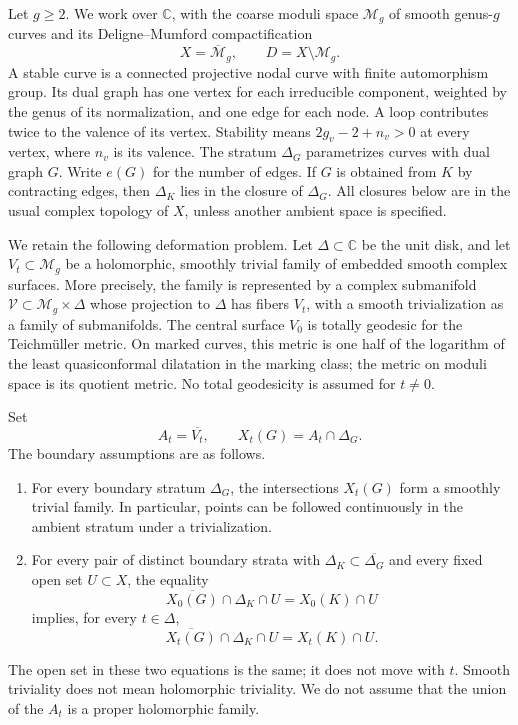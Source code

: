 \documentclass[11pt]{article}
\newcommand{\M}{\mathcal M}
\newcommand{\Mb}{\overline{\mathcal M}}
\newcommand{\C}{\mathbb C}
\newcommand{\cl}[1]{\overline{#1}}
\theoremstyle{definition}
\theoremstyle{remark}
\begin{document}
Let $g\geq2$. We work over $\C$, with the coarse moduli space $\M_g$ of smooth genus-$g$ curves and its Deligne--Mumford compactification
\[
 X=\Mb_g,\qquad D=X\setminus\M_g.
\]
A stable curve is a connected projective nodal curve with finite automorphism group. Its dual graph has one vertex for each irreducible component, weighted by the genus of its normalization, and one edge for each node. A loop contributes twice to the valence of its vertex. Stability means $2g_v-2+n_v>0$ at every vertex, where $n_v$ is its valence. The stratum $\Delta_G$ parametrizes curves with dual graph $G$. Write $e(G)$ for the number of edges. If $G$ is obtained from $K$ by contracting edges, then $\Delta_K$ lies in the closure of $\Delta_G$. All closures below are in the usual complex topology of $X$, unless another ambient space is specified.

We retain the following deformation problem. Let $\Delta\subset\C$ be the unit disk, and let $V_t\subset\M_g$ be a holomorphic, smoothly trivial family of embedded smooth complex surfaces. More precisely, the family is represented by a complex submanifold $\mathcal V\subset\M_g\times\Delta$ whose projection to $\Delta$ has fibers $V_t$, with a smooth trivialization as a family of submanifolds. The central surface $V_0$ is totally geodesic for the Teichm\"uller metric. On marked curves, this metric is one half of the logarithm of the least quasiconformal dilatation in the marking class; the metric on moduli space is its quotient metric. No total geodesicity is assumed for $t\ne0$.

Set
\[
 A_t=\cl{V_t},\qquad X_t(G)=A_t\cap\Delta_G.
\]
The boundary assumptions are as follows.
\begin{enumerate}[label=(\roman*),leftmargin=*]
\item\label{hyp:trivial} For every boundary stratum $\Delta_G$, the intersections $X_t(G)$ form a smoothly trivial family. In particular, points can be followed continuously in the ambient stratum under a trivialization.
\item\label{hyp:compat} For every pair of distinct boundary strata with $\Delta_K\subset\cl{\Delta_G}$ and every fixed open set $U\subset X$, the equality
\begin{equation}\label{eq:central-incidence}
 \cl{X_0(G)}\cap\Delta_K\cap U=X_0(K)\cap U
\end{equation}
implies, for every $t\in\Delta$,
\begin{equation}\label{eq:deformed-incidence}
 \cl{X_t(G)}\cap\Delta_K\cap U=X_t(K)\cap U.
\end{equation}
\end{enumerate}
The open set in these two equations is the same; it does not move with $t$. Smooth triviality does not mean holomorphic triviality. We do not assume that the union of the $A_t$ is a proper holomorphic family.
\end{document}
